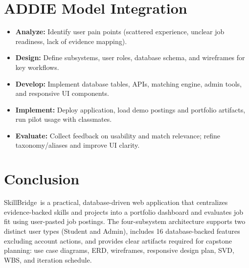 \documentclass[11pt]{article}
\newcommand{\ProjectName}{SkillBridge} %
\begin{document}
\section{ADDIE Model Integration} %
\begin{itemize}[leftmargin=*]
  \item \textbf{Analyze:} Identify user pain points (scattered experience, unclear job readiness, lack of evidence mapping).
  \item \textbf{Design:} Define subsystems, user roles, database schema, and wireframes for key workflows.
  \item \textbf{Develop:} Implement database tables, APIs, matching engine, admin tools, and responsive UI components.
  \item \textbf{Implement:} Deploy application, load demo postings and portfolio artifacts, run pilot usage with classmates.
  \item \textbf{Evaluate:} Collect feedback on usability and match relevance; refine taxonomy/aliases and improve UI clarity.
\end{itemize}

\section{Conclusion}
\ProjectName\ is a practical, database-driven web application that centralizes evidence-backed skills and projects
into a portfolio dashboard and evaluates job fit using user-pasted job postings. The four-subsystem architecture
supports two distinct user types (Student and Admin), includes 16 database-backed features excluding account actions,
and provides clear artifacts required for capstone planning: use case diagrams, ERD, wireframes, responsive design plan,
SVD, WBS, and iteration schedule.
\end{document}
